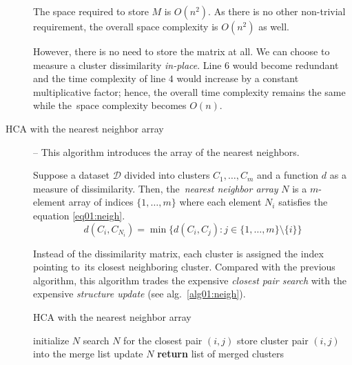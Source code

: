 \begin{description}
	The space required to store $M$ is $O(n^2)$. As there is no other non-trivial requirement, the overall space complexity is $O(n^2)$ as well. 
	\begin{rem}
		However, there is no need to store the matrix at all. We can choose to measure a cluster dissimilarity \emph{in-place}. Line $6$ would become redundant and the time complexity of line $4$ would increase by a constant multiplicative factor; hence, the overall time complexity remains the same while the~space complexity becomes $O(n)$.
	\end{rem}
	

	\item[HCA with the nearest neighbor array] -- This algorithm introduces the array of the nearest neighbors.
	
	\begin{defn}
		Suppose a dataset $\mathcal{D}$ divided into clusters $C_1,\dots,C_m$ and a function $d$ as a measure of dissimilarity. Then, the~\emph{nearest neighbor array} $N$ is a $m$-element array of indices $\{1,\dots,m\}$ where each element $N_i$ satisfies the equation \ref{eq01:neigh}.
		\begin{equation}
		d(C_i,C_{N_i}) = \min\{d(C_i,C_j) : j \in \{1,\dots,m\} \setminus \{i\}\}
		\label{eq01:neigh}
		\end{equation}
		
		\label{def01:neigh}
	\end{defn}
	
	 Instead of the dissimilarity matrix, each cluster is assigned the index pointing to~its closest neighboring cluster. 
	 Compared with the previous algorithm, this algorithm trades the expensive \emph{closest pair search} with the expensive \emph{structure update}  (see alg.~\ref{alg01:neigh}).
	
	
	
	\begin{algorithm}
		\caption{HCA with the nearest neighbor array}
		\label{alg01:neigh}
		\begin{algorithmic}[1]
			\State initialize $N$
			\State search $N$ for the closest pair $(i,j)$ 
			\State store cluster pair $(i,j)$ into the merge list 
			\State update $N$ 
			\EndFor
			\State \textbf{return} list of merged clusters
			\EndProcedure
		\end{algorithmic}
	\end{algorithm}
	

\end{description}
